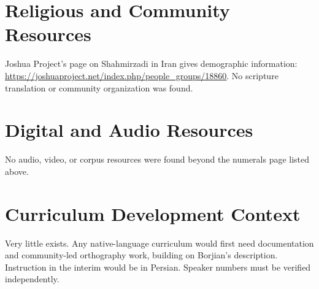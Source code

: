 \documentclass[12pt]{article}
\begin{document}
\section{Religious and Community Resources}
Joshua Project's page on Shahmirzadi in Iran gives demographic information: \url{https://joshuaproject.net/index.php/people_groups/18860}. No scripture translation or community organization was found.

\section{Digital and Audio Resources}
No audio, video, or corpus resources were found beyond the numerals page listed above.

\section{Curriculum Development Context}
Very little exists. Any native-language curriculum would first need documentation and community-led orthography work, building on Borjian's description. Instruction in the interim would be in Persian. Speaker numbers must be verified independently.
\end{document}
